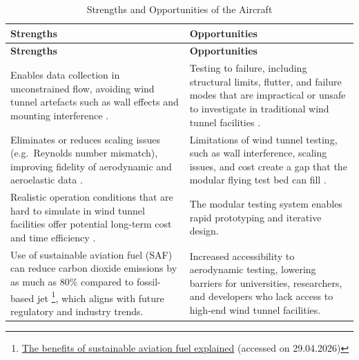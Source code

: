 \begin{longtable}{|p{}|p{}|}
\caption{Strengths and Opportunities of the Aircraft}
\label{tab:SO} \\

\hline
\rowcolor[HTML]{ABE7F3}
\textbf{Strengths} & \textbf{Opportunities} \\ \hline
\endfirsthead

\hline
\rowcolor[HTML]{ABE7F3}
\textbf{Strengths} & \textbf{Opportunities} \\ \hline
\endhead

Enables data collection in unconstrained flow, avoiding wind tunnel artefacts such as wall effects and mounting interference \cite{Castro2026}.
&
Testing to failure, including structural limits, flutter, and failure modes that are impractical or unsafe to investigate in traditional wind tunnel facilities \cite{Castro2026}.
\\ \hline

\rowcolor[HTML]{ECF4FF}
Eliminates or reduces scaling issues (e.g.\ Reynolds number mismatch), improving fidelity of aerodynamic and aeroelastic data \cite{Castro2026}.
&
Limitations of wind tunnel testing, such as wall interference, scaling issues, and cost create a gap that the modular flying test bed can fill \cite{Castro2026}.
\\ \hline

Realistic operation conditions that are hard to simulate in wind tunnel facilities offer potential long-term cost and time efficiency \cite{article}.
&
The modular testing system enables rapid prototyping and iterative design.
\\ \hline

\rowcolor[HTML]{ECF4FF}
Use of sustainable aviation fuel (SAF) can reduce carbon dioxide emissions by as much as 80\% compared to fossil-based jet \footnote{\href{https://www.carbonclick.com/news-views/the-benefits-of-sustainable-aviation-fuel-explained}{The benefits of sustainable aviation fuel explained} (accessed on 29.04.2026)}, which aligns with future regulatory and industry trends.
&
Increased accessibility to aerodynamic testing, lowering barriers for universities, researchers, and developers who lack access to high-end wind tunnel facilities.
\\ \hline


\end{longtable}
